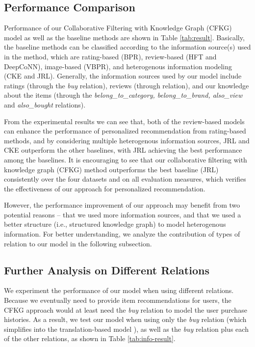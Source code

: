 \documentclass[algorithms,article,accept,moreauthors,pdftex,10pt,a4paper]{Definitions/mdpi}
\begin{document}
\subsection{Performance Comparison}
Performance of our Collaborative Filtering with Knowledge Graph (CFKG) model as well as the baseline methods are shown in Table \ref{tab:result}. Basically, the baseline methods can be classified according to the information source(s) used in the method, which are rating-based (BPR), review-based (HFT and DeepCoNN), image-based (VBPR), and heterogenous information modeling (CKE and JRL). Generally, the information sources used by our model include ratings (through the \textit{buy} relation), reviews (through  relation), and our knowledge about the items (through the \textit{belong\_to\_category, belong\_to\_brand, also\_view} and \textit{also\_bought} relations).

From the experimental results we can see that, both of the review-based models can enhance the performance of personalized recommendation from rating-based methods, and by considering multiple heterogenous information sources, JRL and CKE outperform the other baselines, with JRL achieving the best performance among the baselines. It is encouraging to see that our collaborative filtering with knowledge graph (CFKG) method outperforms the best baseline (JRL) consistently over the four datasets and on all evaluation measures, which verifies the effectiveness of our approach for personalized recommendation. 


However, the performance improvement of our approach may benefit from two potential reasons -- that we used more information sources, and that we used a better structure (i.e., structured knowledge graph) to model heterogenous information. For better understanding, we analyze the contribution of types of relation to our model in the following subsection.

\subsection{Further Analysis on Different Relations}
We experiment the performance of our model when using different relations. Because we eventually need to provide item recommendations for users, the CFKG approach would at least need the \textit{buy} relation to model the user purchase histories. As a result, we test our model when using only the \textit{buy} relation (which simplifies into the translation-based model \cite{he2017translation}), as well as the \textit{buy} relation plus each of the other relations, as shown in Table \ref{tab:info-result}.
\end{document}
